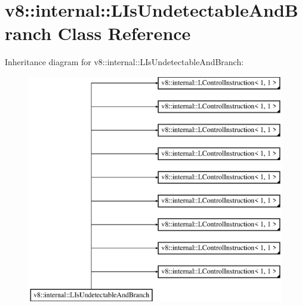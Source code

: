 \hypertarget{classv8_1_1internal_1_1_l_is_undetectable_and_branch}{}\section{v8\+:\+:internal\+:\+:L\+Is\+Undetectable\+And\+Branch Class Reference}
\label{classv8_1_1internal_1_1_l_is_undetectable_and_branch}
Inheritance diagram for v8\+:\+:internal\+:\+:L\+Is\+Undetectable\+And\+Branch\+:\begin{figure}[H]
\begin{center}
\leavevmode
\includegraphics[height=10.000000cm]{classv8_1_1internal_1_1_l_is_undetectable_and_branch}
\end{center}
\end{figure}
